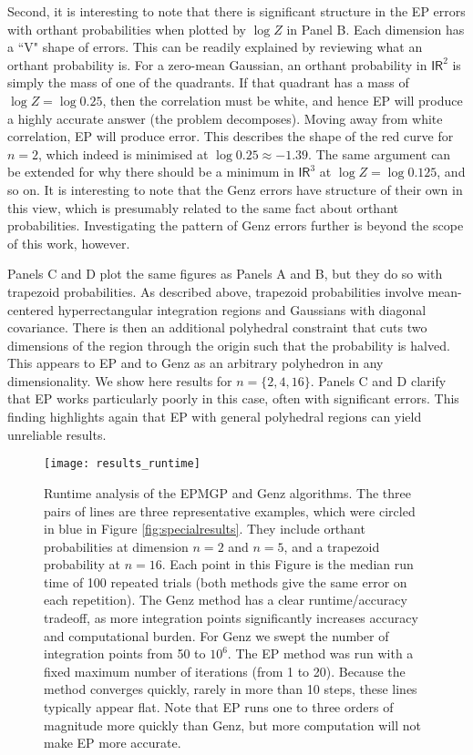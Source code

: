 \documentclass[twoside,11pt]{article}
\newcommand{\reals}{\mathsf{I\!R}}
\begin{document}
Second, it is interesting to note that there is significant structure in the EP errors with orthant probabilities when plotted by $\log Z$ in Panel B.  Each dimension has a ``V" shape of errors.  This can be readily explained by reviewing what an orthant probability is.  For a zero-mean Gaussian, an orthant probability in $\reals^2$ is simply the mass of one of the quadrants.  If that quadrant has a mass of $\log Z = \log 0.25$, then the correlation must be white, and hence EP will produce a highly accurate answer (the problem decomposes).  Moving away from white correlation, EP will produce error.  This describes the shape of the red curve for $n=2$, which indeed is minimised at $\log 0.25 \approx -1.39$.  The same argument can be extended for why there should be a minimum in $\reals^3$ at $\log Z = \log 0.125$, and so on.  It is interesting to note that the Genz errors have structure of their own in this view, which is presumably related to the same fact about orthant probabilities.  Investigating the pattern of Genz errors further is beyond the scope of this work, however. 

Panels C and D plot the same figures as Panels A and B, but they do so with trapezoid probabilities.   As described above, trapezoid probabilities involve mean-centered hyperrectangular integration regions and Gaussians with diagonal covariance.  There is then an additional polyhedral constraint that cuts two dimensions of the region through the origin such that the probability is halved.  This appears to EP and to Genz as an arbitrary polyhedron in any dimensionality.  We show here results for $n = \{2,4,16\}$.  Panels C and D clarify that EP works particularly poorly in this case, often with significant errors.  This finding highlights again that EP with general polyhedral regions can yield unreliable results.  
%
\begin{figure}
\centering
\hspace{0.0cm}
\texttt{[image: results\_runtime]}
\caption{\small{Runtime analysis of the EPMGP and Genz algorithms.   The three pairs of lines are three representative examples, which were circled in blue in Figure \ref{fig:specialresults}.  They include orthant probabilities at dimension $n=2$ and $n=5$, and a trapezoid probability at $n=16$.  Each point in this Figure is the median run time of 100 repeated trials (both methods give the same error on each repetition).  The Genz method has a clear runtime/accuracy tradeoff, as more integration points significantly increases accuracy and computational burden.  For Genz we swept the number of integration points from 50 to $10^6$.  The EP method was run with a fixed maximum number of iterations (from 1 to 20).  Because the method converges quickly, rarely in more than 10 steps, these lines typically appear flat.  Note that EP runs one to three orders of magnitude more quickly than Genz, but more computation will not make EP more accurate.  }}
\label{fig:runtimeresults} %
\end{figure}
%
\end{document}
